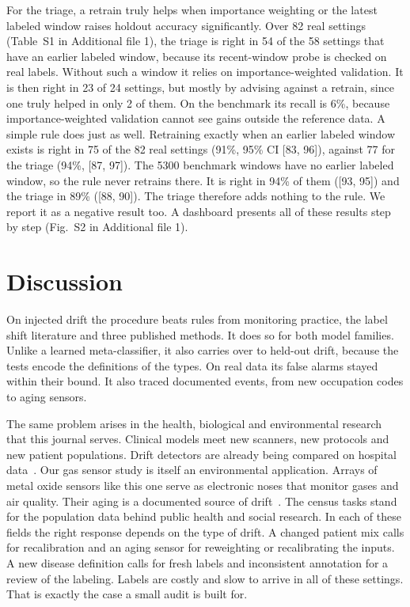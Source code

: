 \documentclass[pdflatex,referee,lineno,sn-basic]{sn-jnl}
\begin{document}
For the triage, a retrain truly helps when importance weighting or the latest labeled window raises holdout accuracy significantly. Over 82 real settings (Table~S1 in Additional file 1), the triage is right in 54 of the 58 settings that have an earlier labeled window, because its recent-window probe is checked on real labels. Without such a window it relies on importance-weighted validation. It is then right in 23 of 24 settings, but mostly by advising against a retrain, since one truly helped in only 2 of them. On the benchmark its recall is 6\%, because importance-weighted validation cannot see gains outside the reference data. A simple rule does just as well. Retraining exactly when an earlier labeled window exists is right in 75 of the 82 real settings (91\%, 95\% CI [83, 96]), against 77 for the triage (94\%, [87, 97]). The 5300 benchmark windows have no earlier labeled window, so the rule never retrains there. It is right in 94\% of them ([93, 95]) and the triage in 89\% ([88, 90]). The triage therefore adds nothing to the rule. We report it as a negative result too. A dashboard presents all of these results step by step (Fig.~S2 in Additional file 1).

\section{Discussion}\label{sec:discussion}

On injected drift the procedure beats rules from monitoring practice, the label shift literature and three published methods. It does so for both model families. Unlike a learned meta-classifier, it also carries over to held-out drift, because the tests encode the definitions of the types. On real data its false alarms stayed within their bound. It also traced documented events, from new occupation codes to aging sensors.

The same problem arises in the health, biological and environmental research that this journal serves. Clinical models meet new scanners, new protocols and new patient populations. Drift detectors are already being compared on hospital data~\citep{kore2024medical,koch2024postmarket,roschewitz2025shiftid}. Our gas sensor study is itself an environmental application. Arrays of metal oxide sensors like this one serve as electronic noses that monitor gases and air quality. Their aging is a documented source of drift~\citep{vergara2012gas}. The census tasks stand for the population data behind public health and social research. In each of these fields the right response depends on the type of drift. A changed patient mix calls for recalibration and an aging sensor for reweighting or recalibrating the inputs. A new disease definition calls for fresh labels and inconsistent annotation for a review of the labeling. Labels are costly and slow to arrive in all of these settings. That is exactly the case a small audit is built for.
\end{document}
